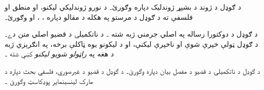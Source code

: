\documentclass[../../../include/open-logic-section]{subfiles}
\begin{document}
\begin{reading}
د ګوډل د ژوند د بشپړ ژوندليک دپاره
\citet{Dawson1997} وګورئ۔ د نورو ژوندليکي
ليکنو، او منطق او فلسفې ته د ګوډل د
مرستو په هکله د مقالو دپاره
\citet{Wang1990}، \citet{Baaz2011}،
\citet{Takeuti2003} او \citet{Sigmund2007}
وګورئ۔

د ګوډل د دوکتورا رساله په اصلي جرمني ژبه
شته \citep{Godel1929}۔ د ناتکميلۍ د قضيو
اصلي متن \citep{Godel1931} دے۔ د ګوډل
ټولې خپرې شوې او ناخپرې ليکنې، او د
ليکونو يوه ټاکلې برخه، په انګرېزي ژبه
د هغه په \emph{راټولو شويو ليکنو}
کښې شته \citet{Godel1986,Godel1990}۔

د ګوډل د ناتکميلۍ د قضيو د مفصل بيان
دپاره \citet{Smith2013} وګورئ۔ د ګوډل
د قضيو د غيرصوري، فلسفي بحث دپاره
د مارک لينسېنماير پوډکاسټ وګورئ
\citep{Linsenmayer2014}۔
\end{reading}
\end{document}
